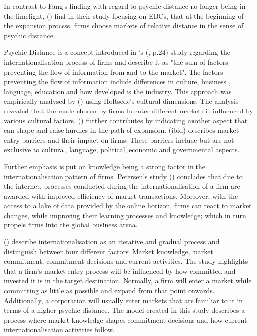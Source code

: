 \documentclass[11pt,a4paper]{article}
\begin{document}
In contrast to Fang's finding with regard to psychic distance no longer being in the limelight, \citeauthor{forsgrenIgnorantImpatientInternationalization2007} (\citeyear{forsgrenIgnorantImpatientInternationalization2007})  find in their study focusing on EBCs, that at the beginning of the expansion process, firms choose markets of relative distance in the sense of psychic distance. \par
Psychic Distance is a concept introduced in \citeauthor{johansonInternationalizationProcessFirm1977}'s (\citeyear{johansonInternationalizationProcessFirm1977}, p.24) study regarding the internationalisation process of firms and describe it as "the sum of factors preventing the flow of information from and to the market". The factors preventing the flow of information include differences in culture, business , language, education and how developed is the industry.  This approach was empirically analysed by \citeauthor{kogutEffectNationalCulture1988} (\citeyear{kogutEffectNationalCulture1988}) using Hoftsede's cultural dimensions. The analysis revealed that the mode chosen by firms to enter different markets is influenced by various cultural factors. 
\citeauthor{karakayaBarriersEntryInternational1993} (\citeyear{karakayaBarriersEntryInternational1993}) further contributes  by indicating another aspect that can shape and raise hurdles in the path of expansion. \citeauthor{karakayaBarriersEntryInternational1993} (ibid) describes market entry barriers and their impact on firms. These barriers include but are not exclusive to cultural, language, political, economic and governmental aspects. \par
Further emphasis is put on knowledge being a strong factor in the internationalisation pattern of firms. Petersen's study (\citeyear{petersenInternetForeignMarket2002}) concludes that due to the internet, processes conducted during the internationalisation of a firm are awarded with improved efficiency of market transactions. Moreover, with the access to a lake of data provided by the online horizon, firms can react to market changes, while improving their learning processes and knowledge; which in turn propels firms into the global business arena. \par 
\citeauthor{johansonInternationalizationProcessFirm1977} (\citeyear{johansonInternationalizationProcessFirm1977}) describe internationalisation as an iterative and gradual process and distinguish between four different factors: Market knowledge, market commitment, commitment decisions and current activities. The study highlights that a firm's market entry process will be influenced by how committed and invested it is in the target destination. Normally, a firm will enter a market while committing as little as possible and expand from that point onwards. Additionally, a corporation will usually enter markets that are familiar to it in terms of a higher psychic distance. The model created in this study describes a process where market knowledge shapes commitment decisions and how current internationalisation activities follow.  \par
\end{document}
